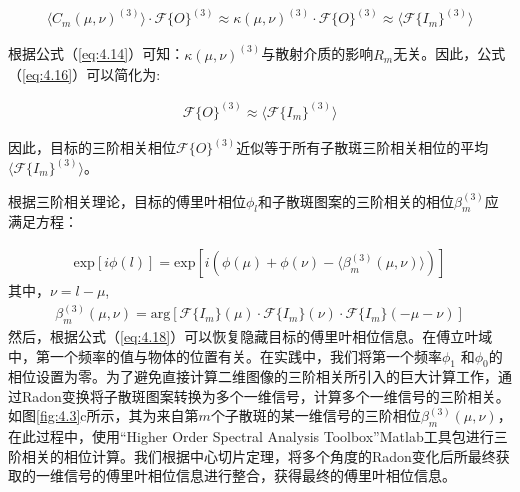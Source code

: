 \begin{equation}
\begin{aligned}
    \langle C_m(\mu,\nu)^{(3)} \rangle \cdot \mathcal{F}\{ O \}^{(3)} \approx \kappa(\mu,\nu)^{(3)}\cdot \mathcal{F}\{ O \}^{(3)} \approx   \langle \mathcal{F}\{ I_m \}^{(3)} \rangle
\end{aligned}
\label{eq:4.16}
\end{equation}

根据公式（\ref{eq:4.14}）可知：$\kappa(\mu,\nu)^{(3)}$与散射介质的影响$R_m$无关。因此，公式（\ref{eq:4.16}）可以简化为:

\begin{equation}
\begin{aligned}
   \mathcal{F}\{ O \}^{(3)} \approx   \langle \mathcal{F}\{ I_m \}^{(3)} \rangle
\end{aligned}
\label{eq:4.17}
\end{equation}

因此，目标的三阶相关相位$\mathcal{F}\{ O \}^{(3)}$近似等于所有子散斑三阶相关相位的平均$\langle \mathcal{F}\{ I_m \}^{(3)} \rangle$。

根据三阶相关理论，目标的傅里叶相位$\phi_{l}$和子散斑图案的三阶相关的相位$\beta_{m}^{(3)}$应满足方程：

\begin{equation}
\begin{aligned}
   \mbox{exp}[i\phi(l)]= \mbox{exp}\left[i(\phi(\mu)+\phi(\nu)- \langle {\beta_{m}^{(3)}(\mu,\nu)} \rangle)\right]
\end{aligned}
\label{eq:4.18}
\end{equation}其中，$\nu=l-\mu$,
\begin{equation}
\begin{aligned}
  {\beta_{m}^{(3)}(\mu,\nu)}= \mbox{arg}\left[\mathcal{F}\{I_m\}(\mu)\cdot \mathcal{F}\{I_m\}(\nu) \cdot \mathcal{F}\{I_m\}(-\mu-\nu)\right]
\end{aligned}
\label{eq:4.19}
\end{equation}
然后，根据公式（\ref{eq:4.18}）可以恢复隐藏目标的傅里叶相位信息。在傅立叶域中，第一个频率的值与物体的位置有关。在实践中，我们将第一个频率$\phi_{1}$ 和$\phi_{0}$的相位设置为零。为了避免直接计算二维图像的三阶相关所引入的巨大计算工作，通过Radon变换\cite{ayers_knoxthompson_1988}将子散斑图案转换为多个一维信号，计算多个一维信号的三阶相关。如图\ref{fig:4.3}c所示，其为来自第$m$个子散斑的某一维信号的三阶相位${\beta_{m}^{(3)}(\mu,\nu)}$，在此过程中，使用“Higher Order
Spectral Analysis Toolbox”Matlab工具包进行三阶相关的相位计算。我们根据中心切片定理，将多个角度的Radon变化后所最终获取的一维信号的傅里叶相位信息进行整合，获得最终的傅里叶相位信息。

